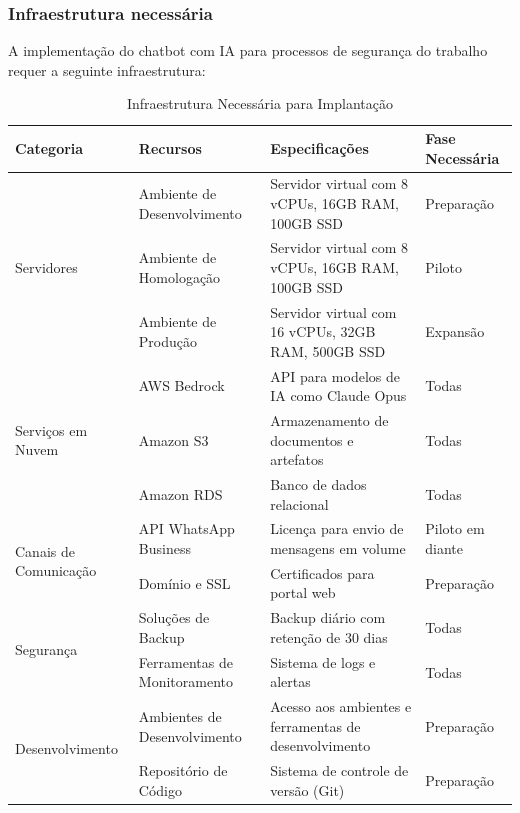\documentclass[12pt,a4paper]{article}
\renewcommand{\arraystretch}{1.2}
\begin{document}
\subsubsection{Infraestrutura necessária}

A implementação do chatbot com IA para processos de segurança do trabalho requer a seguinte infraestrutura:

\begin{table}[H]
\centering
\begin{adjustbox}{max width=\textwidth}
\renewcommand{\arraystretch}{1.2}
\begin{tabular}{|p{3cm}|p{5cm}|p{4cm}|p{3cm}|}
\hline
\rowcolor{gray!20}
\textbf{Categoria} & \textbf{Recursos} & \textbf{Especificações} & \textbf{Fase Necessária} \\
\hline
\multirow{3}{*}{Servidores} & Ambiente de Desenvolvimento & Servidor virtual com 8 vCPUs, 16GB RAM, 100GB SSD & Preparação \\
\cline{2-4}
 & Ambiente de Homologação & Servidor virtual com 8 vCPUs, 16GB RAM, 100GB SSD & Piloto \\
\cline{2-4}
 & Ambiente de Produção & Servidor virtual com 16 vCPUs, 32GB RAM, 500GB SSD & Expansão \\
\hline
\multirow{3}{*}{Serviços em Nuvem} & AWS Bedrock & API para modelos de IA como Claude Opus & Todas \\
\cline{2-4}
 & Amazon S3 & Armazenamento de documentos e artefatos & Todas \\
\cline{2-4}
 & Amazon RDS & Banco de dados relacional & Todas \\
\hline
\multirow{2}{*}{Canais de Comunicação} & API WhatsApp Business & Licença para envio de mensagens em volume & Piloto em diante \\
\cline{2-4}
 & Domínio e SSL & Certificados para portal web & Preparação \\
\hline
\multirow{2}{*}{Segurança} & Soluções de Backup & Backup diário com retenção de 30 dias & Todas \\
\cline{2-4}
 & Ferramentas de Monitoramento & Sistema de logs e alertas & Todas \\
\hline
\multirow{2}{*}{Desenvolvimento} & Ambientes de Desenvolvimento & Acesso aos ambientes e ferramentas de desenvolvimento & Preparação \\
\cline{2-4}
 & Repositório de Código & Sistema de controle de versão (Git) & Preparação \\
\hline
\end{tabular}
\end{adjustbox}
\caption{Infraestrutura Necessária para Implantação}
\end{table}
\end{document}
